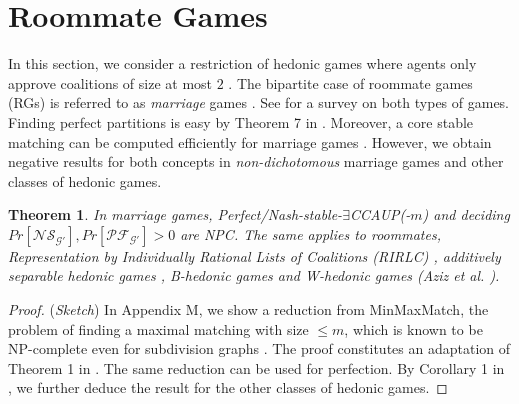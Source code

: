 \documentclass[letterpaper]{article}
\newtheorem{theorem}{Theorem}
\begin{document}
\section{Roommate Games}
\label{sec:Roommates}
In this section, we consider a restriction of hedonic games where agents only approve coalitions of size at most $2$ \cite{gardenfors1975match}. The bipartite case of roommate games (RGs) is referred to as \textit{marriage} games \cite{gale1962college}. See \cite{gusfield1989stable} for a survey on both types of games. %
Finding perfect partitions is easy by Theorem 7 in \cite{aziz2013pareto}. Moreover, a core stable matching can be computed efficiently for marriage games \cite{gale1962college}. However, we obtain negative results for both concepts in \textit{non-dichotomous} marriage games and other classes of hedonic games.
\begin{theorem}
\label{theorem:nash-stable-marriage}
In marriage games, Perfect/Nash-stable-$\exists$CCAUP(-$m$) and deciding $Pr[\mathcal{NS}_{\mathcal{G}'}], Pr[\mathcal{PF}_{\mathcal{G}'}] > 0$ are NPC. The same applies to {\normalfont roommates}, {\normalfont Representation by Individually Rational Lists of Coalitions (RIRLC)} \cite{ballester2004np}, {\normalfont additively separable hedonic games} \cite{olsen2009nash}, {\normalfont B-hedonic games} and {\normalfont W-hedonic games} (Aziz et al. ).
\end{theorem}
\begin{proof}
(\textit{Sketch}) In Appendix M, we show a reduction from MinMaxMatch, the problem of finding a maximal matching with size $\leq m$, which is known to be NP-complete even for subdivision graphs \cite{horton1993minimum}. The proof constitutes an adaptation of Theorem 1 in \cite{aziz2013stable}. The same reduction can be used for perfection. %
By Corollary 1 in \cite{aziz2013stable}, we further deduce the result for the other classes of hedonic games.
\end{proof}
\end{document}

